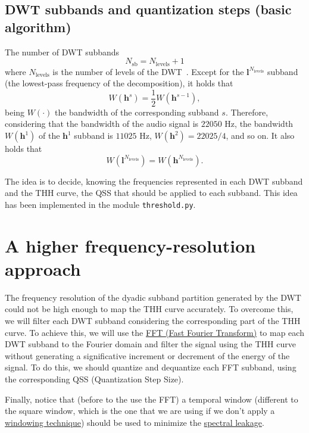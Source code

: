 \subsection{DWT subbands and quantization steps (basic algorithm)}
The number of DWT subbands
\begin{equation}
  N_{\text{sb}} = N_{\text{levels}} + 1
\end{equation}
where $N_{\text{levels}}$ is the number of levels of the
DWT~\cite{vetterli1995wavelets}. Except for the
${\mathbf l}^{N_{\text{levels}}}$ subband (the lowest-pass frequency
of the decomposition), it holds that
\begin{equation}
  W({\mathbf h}^s) = \frac{1}{2}W({\mathbf h}^{s-1}),
\end{equation}
being $W(\cdot)$ the bandwidth of the corresponding
subband $s$. Therefore, considering that the bandwidth of the audio signal
is $22050$ Hz, the bandwidth $W({\mathbf h}^1)$ of the ${\mathbf h}^1$ subband is $11025$ Hz,
$W({\mathbf h} ^2)=22025/4$, and so on. It also holds that
\begin{equation}
  W({\mathbf l}^{N_{\text{levels}}}) = W({\mathbf h}^{N_{\text{levels}}}).
\end{equation}

The idea is to decide, knowing the frequencies represented in each DWT
subband and the THH curve, the QSS that should be
applied to each subband. This idea has been implemented in the module
\verb|threshold.py|.

\section{A higher frequency-resolution approach}

The frequency resolution of the dyadic subband partition generated by
the DWT could not be high enough to map the THH curve accurately. To
overcome this, we will filter each DWT subband considering the
corresponding part of the THH curve. To achieve this, we will use the
\href{https://numpy.org/doc/stable/reference/routines.fft.html}{FFT
  (Fast Fourier Transform)} to map each DWT subband to the Fourier
domain and filter the signal using the THH curve without generating a
significative increment or decrement of the energy of the signal. To
do this, we should quantize and dequantize each FFT subband, using the
corresponding QSS (Quantization Step Size).

Finally, notice that (before to the use the FFT) a temporal window
(different to the square window, which is the one that we are using if
we don't apply a
\href{https://en.wikipedia.org/wiki/Window_function}{windowing
  technique}) should be used to minimize the
\href{https://en.wikipedia.org/wiki/Spectral_leakage}{spectral
  leakage}.

